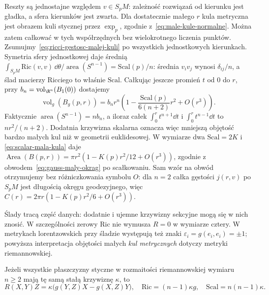 Reszty są jednostajne względem $v\in S_pM$: zależność
rozwiązań od kierunku jest gładka, a sfera kierunków
jest zwarta. Dla dostatecznie małego $r$ kula metryczna
jest obrazem kuli stycznej przez $\exp_p$, zgodnie
z~\eqref{eq:male-kule-normalne}. Można zatem całkować
w tych współrzędnych bez wielokrotnego liczenia punktów.
Zsumujmy~\eqref{eq:ricci-gestosc-malej-kuli} po
wszystkich jednostkowych kierunkach. Symetria sfery
jednostkowej daje średnią
$\int_{S_pM}\mathrm{Ric}(v,v)\,\dd\theta/
\operatorname{area}(S^{n-1})=\mathrm{Scal}(p)/n$:
średnia $v_iv_j$ wynosi $\delta_{ij}/n$, a ślad
macierzy Ricciego to właśnie $\mathrm{Scal}$.
Całkując jeszcze promień $t$ od $0$ do $r$, przy
$b_n=\operatorname{vol}_{\R^n}(B_1(0))$ dostajemy
\begin{equation}\label{eq:scalar-mala-kula}
 \operatorname{vol}_g(B_g(p,r))
 =b_nr^n\left(1-\frac{\mathrm{Scal}(p)}{6(n+2)}r^2
                                      +O(r^3)\right).
\end{equation}
Faktycznie $\operatorname{area}(S^{n-1})=nb_n$,
a iloraz całek $\int_0^r t^{n+1}\dd t$ i
$\int_0^r t^{n-1}\dd t$ to $nr^2/(n+2)$.
Dodatnia krzywizna skalarna oznacza więc mniejszą
objętość bardzo małych kul niż w geometrii euklidesowej.
W wymiarze dwa $\mathrm{Scal}=2K$ i
\eqref{eq:scalar-mala-kula} daje
$\operatorname{Area}(B(p,r))
=\pi r^2(1-K(p)r^2/12+O(r^3))$, zgodnie z
obwodem~\eqref{eq:gauss-maly-okrag} po scałkowaniu.
Sam wzór na obwód otrzymujemy bez różniczkowania symbolu $O$:
dla $n=2$ całka gęstości $j(r,v)$ po $S_pM$ jest długością
okręgu geodezyjnego, więc
$C(r)=2\pi r(1-K(p)r^2/6+O(r^3))$.

Ślady tracą część danych: dodatnie i ujemne krzywizny
sekcyjne mogą się w nich znosić. W szczególności zerowy
$\mathrm{Ric}$ nie wymusza $R=0$ w wymiarze cztery.
W metrykach lorentzowskich przy śladzie występują też
znaki $\varepsilon_i=g(e_i,e_i)=\pm1$; powyższa
interpretacja objętości małych \emph{kul metrycznych}
dotyczy metryki riemannowskiej.

\begin{twierdzenie}
\label{thm:stala-krzywizna}
Jeżeli wszystkie płaszczyzny styczne w rozmaitości
riemannowskiej wymiaru $n\geq2$ mają tę samą stałą
krzywiznę $\kappa$, to
\begin{equation}\label{eq:stala-krzywizna-tensor}
 R(X,Y)Z=\kappa\bigl(g(Y,Z)X-g(X,Z)Y\bigr),
 \quad \mathrm{Ric}=(n-1)\kappa g,
 \quad \mathrm{Scal}=n(n-1)\kappa.
\end{equation}
\end{twierdzenie}

